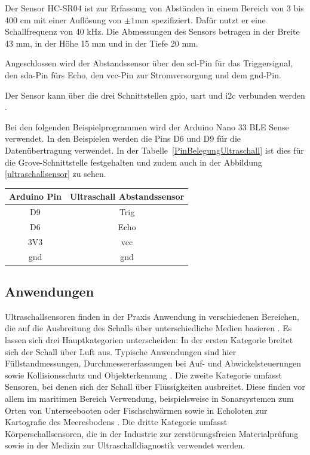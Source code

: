 Der Sensor HC-SR04 ist  zur Erfassung von Abständen in einem Bereich von 3 bis 400 cm mit einer Auflösung von $\pm 1$mm spezifiziert. Dafür nutzt er eine Schallfrequenz von 40 kHz.   Die Abmessungen des Sensors betragen in der Breite 43 mm, in der Höhe 15 mm und in der Tiefe 20 mm. 

Angeschlossen wird der Abstandssensor über den \ac{scl}-Pin für das Triggersignal, den \ac{sda}-Pin fürs Echo, den \ac{vcc}-Pin zur Stromversorgung und dem \ac{gnd}-Pin. 

Der Sensor kann über die drei Schnittstellen \ac{gpio}, \ac{uart} und \ac{i2c} verbunden werden \cite{Simac:2017}. 


Bei den folgenden Beispielprogrammen wird der Arduino Nano 33 BLE Sense verwendet. In den Beispielen werden die Pins D6 und D9 für die Datenübertragung verwendet. In der Tabelle~\ref{PinBelegungUltraschall}  ist dies für die Grove-Schnittstelle festgehalten und zudem auch in der Abbildung \ref{ultraschallsensor} zu sehen.

\begin{center}
	\begin{tabular}{c|c}
		Arduino Pin & Ultraschall Abstandssensor\\ \hline
		D9 & Trig\\
		D6 & Echo\\
		3V3 & \acs{vcc}\\
		\acs{gnd} & \acs{gnd}\\
	\end{tabular}
	\label{PinBelegungUltraschall}
\end{center}

\subsection{Anwendungen}
Ultraschallsensoren finden in der Praxis Anwendung in verschiedenen Bereichen, die auf die Ausbreitung des Schalls über unterschiedliche Medien basieren \cite{Hering:2023}. Es lassen sich drei Hauptkategorien unterscheiden: In der ersten Kategorie breitet sich der Schall über Luft aus. Typische Anwendungen sind hier Füllstandmessungen, Durchmessererfassungen bei Auf- und Abwickelsteuerungen sowie Kollisionsschutz und Objekterkennung \cite{Hering:2023}. Die zweite Kategorie umfasst Sensoren, bei denen sich der Schall über Flüssigkeiten ausbreitet. Diese finden vor allem im maritimen Bereich Verwendung, beispielsweise in Sonarsystemen zum Orten von Unterseebooten oder Fischschwärmen sowie in Echoloten zur Kartografie des Meeresbodens \cite{Hering:2021}. Die dritte Kategorie umfasst Körperschallsensoren, die in der Industrie zur zerstörungsfreien Materialprüfung sowie in der Medizin zur Ultraschalldiagnostik verwendet werden. \cite{Hering:2021}

